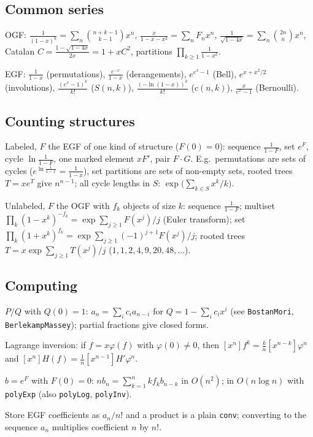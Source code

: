 	\subsection{Common series}
		OGF: $\frac1{(1-x)^k} = \sum_n \binom{n+k-1}{k-1} x^n$, $\frac{x}{1-x-x^2} = \sum_n F_n x^n$, $\frac1{\sqrt{1-4x}} = \sum_n \binom{2n}n x^n$,
		Catalan $C = \frac{1-\sqrt{1-4x}}{2x} = 1 + xC^2$, partitions $\prod_{k \ge 1} \frac1{1-x^k}$.

		EGF: $\frac1{1-x}$ (permutations), $\frac{e^{-x}}{1-x}$ (derangements), $e^{e^x-1}$ (Bell), $e^{x + x^2/2}$ (involutions),
		$\frac{(e^x-1)^k}{k!}$ ($S(n,k)$), $\frac{(-\ln(1-x))^k}{k!}$ ($c(n,k)$), $\frac{x}{e^x-1}$ (Bernoulli).

	\subsection{Counting structures}
		Labeled, $F$ the EGF of one kind of structure ($F(0) = 0$): sequence $\frac1{1-F}$, set $e^F$, cycle $\ln\frac1{1-F}$, one marked element $xF'$, pair $F \cdot G$.
		E.g.\ permutations are sets of cycles ($e^{\ln \frac1{1-x}} = \frac1{1-x}$), set partitions are sets of non-empty sets, rooted trees $T = xe^T$ give $n^{n-1}$;
		all cycle lengths in $S$: $\exp\bigl(\sum_{k \in S} x^k/k\bigr)$.

		Unlabeled, $F$ the OGF with $f_k$ objects of size $k$: sequence $\frac1{1-F}$; multiset $\prod_k (1-x^k)^{-f_k} = \exp \sum_{j \ge 1} F(x^j)/j$ (Euler transform);
		set $\prod_k (1+x^k)^{f_k} = \exp \sum_{j \ge 1} (-1)^{j+1} F(x^j)/j$; rooted trees $T = x \exp \sum_{j \ge 1} T(x^j)/j$ ($1, 1, 2, 4, 9, 20, 48, \dots$).

	\subsection{Computing}
		$P/Q$ with $Q(0) = 1$: $a_n = \sum_i c_i a_{n-i}$ for $Q = 1 - \sum_i c_i x^i$ (see \texttt{BostanMori}, \texttt{BerlekampMassey}); partial fractions give closed forms.

		Lagrange inversion: if $f = x \varphi(f)$ with $\varphi(0) \ne 0$, then $[x^n] f^k = \frac kn [x^{n-k}] \varphi^n$ and $[x^n] H(f) = \frac1n [x^{n-1}] H'\varphi^n$.

		$b = e^F$ with $F(0) = 0$: $n b_n = \sum_{k=1}^n k f_k b_{n-k}$ in $O(n^2)$; in $O(n \log n)$ with \texttt{polyExp} (also \texttt{polyLog}, \texttt{polyInv}).

		Store EGF coefficients as $a_n/n!$ and a product is a plain \texttt{conv}; converting to the sequence $a_n$ multiplies coefficient $n$ by $n!$.
